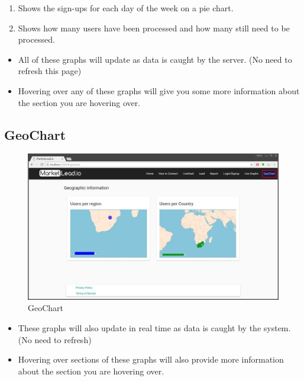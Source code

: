 \documentclass{article}
\begin{document}
			\begin{enumerate}
				\item Shows the sign-ups for each day of the week on a pie chart.
				\item Shows how many users have been processed and how many still need to be processed.
			\end{enumerate}

			\begin{itemize}
				\item All of these graphs will update as data is caught by the server. (No need to refresh this page)
				\item Hovering over any of these graphs will give you some more information about the section you are hovering over.
			\end{itemize}

		\subsection{GeoChart}
			\begin{figure}[H]
				\includegraphics[width=\textwidth]{images/geo_chart.jpg}
				\caption{GeoChart}
				\label{fig:geoChart}
			\end{figure}

			\begin{itemize}
				\item These graphs will also update in real time as data is caught by the system. (No need to refresh)
				\item Hovering over sections of these graphs will also provide more information about the section you are hovering over.
			\end{itemize}
\end{document}
